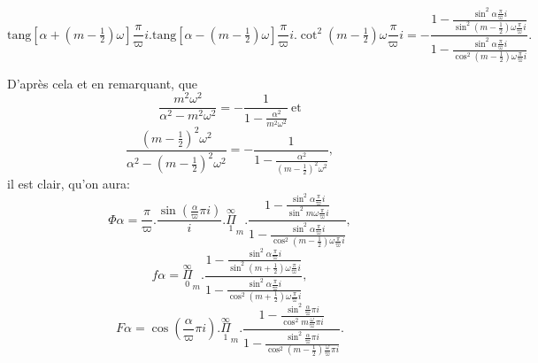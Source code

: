 \documentclass{article}
\begin{document}
\[
\text{tang}[\alpha+(m-\tfrac{1}{2})\omega]\frac{\pi}{\varpi}i.\text{tang}[\alpha-(m-\tfrac{1}{2})\omega]\frac{\pi}{\varpi}i.\cot^{2}(m-\tfrac{1}{2})\omega\frac{\pi}{\varpi}i = -\frac{1-\frac{\sin^{2}\alpha\frac{\pi}{\varpi}i}{\sin^{2}(m-\tfrac{1}{2})\omega\frac{\pi}{\varpi}i}}{1-\frac{\sin^{2}\alpha\frac{\pi}{\varpi}i}{\cos^{2}(m-\tfrac{1}{2})\omega\frac{\pi}{\varpi}i}}.
\]

D'après cela et en remarquant, que
\[
\frac{m^{2}\omega^{2}}{\alpha^{2}-m^{2}\omega^{2}} = -\frac{1}{1-\frac{\alpha^{2}}{m^{2}\omega^{2}}}\ \text{et}
\]
\[
\frac{(m-\tfrac{1}{2})^{2}\omega^{2}}{\alpha^{2}-(m-\tfrac{1}{2})^{2}\omega^{2}} = -\frac{1}{1-\frac{\alpha^{2}}{(m-\tfrac{1}{2})^{2}\omega^{2}}},
\]
il est clair, qu'on aura:
\[
\Phi\alpha = \frac{\pi}{\varpi}.\frac{\sin\left(\frac{\alpha}{\varpi}\pi i\right)}{i}.\overset{\infty}{\underset{1}{\Pi}}_{m}.\frac{1-\frac{\sin^{2}\alpha\frac{\pi}{\varpi}i}{\sin^{2}m\omega\frac{\pi}{\varpi}i}}{1-\frac{\sin^{2}\alpha\frac{\pi}{\varpi}i}{\cos^{2}(m-\tfrac{1}{2})\omega\frac{\pi}{\varpi}i}},
\tag{181.}
\]
\[
f\alpha = \overset{\infty}{\underset{0}{\Pi}}_{m}.\frac{1-\frac{\sin^{2}\alpha\frac{\pi}{\varpi}i}{\sin^{2}(m+\tfrac{1}{2})\omega\frac{\pi}{\varpi}i}}{1-\frac{\sin^{2}\alpha\frac{\pi}{\varpi}i}{\cos^{2}(m+\tfrac{1}{2})\omega\frac{\pi}{\varpi}i}},
\tag{182.}
\]
\[
F\alpha = \cos\left(\frac{\alpha}{\varpi}\pi i\right).\overset{\infty}{\underset{1}{\Pi}}_{m}.\frac{1-\frac{\sin^{2}\frac{\alpha}{\varpi}\pi i}{\cos^{2}m\frac{\omega}{\varpi}\pi i}}{1-\frac{\sin^{2}\frac{\alpha}{\varpi}\pi i}{\cos^{2}(m-\tfrac{1}{2})\frac{\omega}{\varpi}\pi i}}.
\tag{183.}
\]

\end{document}
